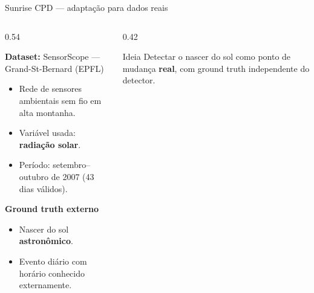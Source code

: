 \documentclass[aspectratio=169, 11pt]{beamer}
\begin{document}
\begin{frame}{Sunrise CPD --- adaptação para dados reais}

\begin{columns}[T]
\begin{column}{0.54\textwidth}

\textbf{Dataset:} SensorScope --- Grand-St-Bernard (EPFL)
\begin{itemize}
  \item Rede de sensores ambientais sem fio em alta montanha.
  \item Variável usada: \textbf{radiação solar}.
  \item Período: setembro--outubro de 2007 (43 dias válidos).
\end{itemize}

\vspace{0.4em}
\textbf{Ground truth externo}
\begin{itemize}
  \item Nascer do sol \textbf{astronômico}.
  \item Evento diário com horário conhecido externamente.
\end{itemize}

\end{column}
\begin{column}{0.42\textwidth}

\begin{block}{Ideia}
Detectar o nascer do sol como ponto de mudança \textbf{real}, com
ground truth independente do detector.
\end{block}

\end{column}
\end{columns}

\end{frame}
\end{document}
